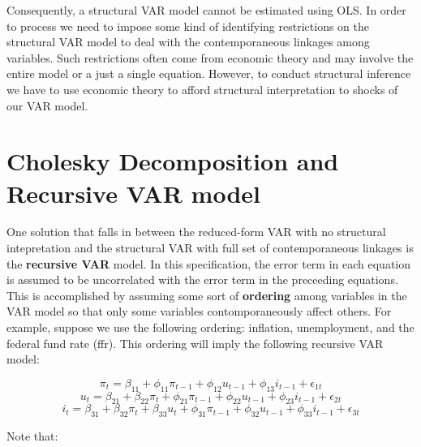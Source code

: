 \documentclass[]{book}
\theoremstyle{definition}
\theoremstyle{definition}
\theoremstyle{definition}
\theoremstyle{remark}
\begin{document}
Consequently, a structural VAR model cannot be estimated using OLS. In order to process we need to impose some kind of identifying restrictions on the structural VAR model to deal with the contemporaneous linkages among variables. Such restrictions often come from economic theory and may involve the entire model or a just a single equation. However, to conduct structural inference we have to use economic theory to afford structural interpretation to shocks of our VAR model.

\hypertarget{cholesky-decomposition-and-recursive-var-model}{%
\section{Cholesky Decomposition and Recursive VAR model}\label{cholesky-decomposition-and-recursive-var-model}}

One solution that falls in between the reduced-form VAR with no structural intepretation and the structural VAR with full set of contemporaneous linkages is the \textbf{recursive VAR} model. In this specification, the error term in each equation is assumed to be uncorrelated with the error term in the preceeding equations. This is accomplished by assuming some sort of \textbf{ordering} among variables in the VAR model so that only some variables contomporaneously affect others. For example, suppose we use the following ordering: inflation, unemployment, and the federal fund rate (ffr). This ordering will imply the following recursive VAR model:

\[\pi_t = \beta_{11} + \phi_{11} \pi_{t-1} + \phi_{12} u_{t-1} + \phi_{13} i_{t-1} + \epsilon_{1t}\]
\[u_t = \beta_{21} + \beta_{22} \pi_t+\phi_{21} \pi_{t-1} + \phi_{22} u_{t-1} + \phi_{23} i_{t-1} + \epsilon_{2t}\]
\[i_t = \beta_{31} + \beta_{32}\pi_t + \beta_{33}u_t+ \phi_{31} \pi_{t-1} + \phi_{32} u_{t-1} + \phi_{33} i_{t-1} + \epsilon_{3t}\]

Note that:
\end{document}
